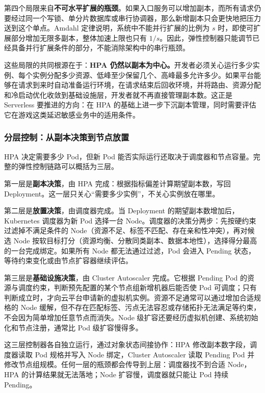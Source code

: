 第四个局限来自\textbf{不可水平扩展的瓶颈}。如果入口服务可以增加副本，而所有请求仍要经过同一个写锁、单分片数据库或串行协调器，那么新增副本只会更快地把压力送到这个单点。Amdahl 定律说明，系统中不能并行扩展的比例为 $s$ 时，即使可扩展部分增加无限多副本，整体加速上限也只有 $1/s$。因此，弹性控制器只能调节已经具备并行扩展条件的部分，不能消除架构中的串行瓶颈。

这些局限的共同根源在于：\textbf{HPA 仍然以副本为中心。}开发者必须关心运行多少实例、每个实例分配多少资源、低峰至少保留几个、高峰最多允许多少。如果平台能够在请求到来时自动准备运行环境，在请求结束后回收环境，并将路由、资源分配和冷启动优化收敛到基础设施层，开发者就不再直接管理副本数。这正是 Serverless 要推进的方向：在 HPA 的基础上进一步下沉副本管理，同时需要评估它在游戏这类延迟敏感业务中的适用条件。

\subsubsection{分层控制：从副本决策到节点放置}

HPA 决定需要多少 Pod，但新 Pod 能否实际运行还取决于调度器和节点容量。完整的弹性控制链路可以概括为三层。

第一层是\textbf{副本决策}，由 HPA 完成：根据指标偏差计算期望副本数，写回 Deployment。这一层只关心“需要多少实例”，不关心实例放在哪里。

第二层是\textbf{放置决策}，由调度器完成。当 Deployment 的期望副本数增加后，Kubernetes 调度器为新 Pod 选择一台 Node。调度器的决策分两步：先按硬约束过滤掉不满足条件的 Node（资源不足、标签不匹配、存在亲和性冲突），再对候选 Node 按软目标打分（资源均衡、分散同类副本、数据本地性），选择得分最高的一台完成绑定。如果所有 Node 都无法通过过滤，Pod 会进入 Pending 状态，等待约束变化或由节点扩容器继续评估。

第三层是\textbf{基础设施决策}，由 Cluster Autoscaler 完成。它根据 Pending Pod 的资源与调度约束，判断预先配置的某个节点组新增机器后能否使 Pod 可调度；只有判断成立时，才向云平台申请新的虚拟机实例。资源不足通常可以通过增加合适规格的 Node 缓解，但不存在匹配标签、污点无法容忍或存储拓扑无法满足等约束，不会因为简单增加任意节点而消失。Node 级扩容还要经历虚拟机创建、系统初始化和节点注册，通常比 Pod 级扩容慢得多。

这三层控制器各自独立运行，通过对象状态间接协作：HPA 修改副本数字段，调度器读取 Pod 规格并写入 Node 绑定，Cluster Autoscaler 读取 Pending Pod 并修改节点组规模。任何一层的瓶颈都会传导到上层：调度器找不到合适 Node，HPA 的计算结果就无法落地；Node 扩容慢，调度器就只能让 Pod 持续 Pending。

